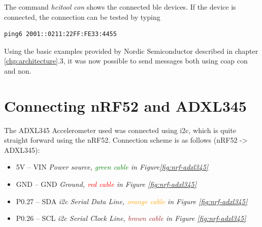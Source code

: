 The command \textit{hcitool con} shows the connected \gls{ble} devices. If the device is connected, the connection can be tested by typing

\begin{verbatim}
ping6 2001::0211:22FF:FE33:4455
\end{verbatim}


Using the basic examples provided by Nordic Semiconductor described in chapter \ref{chp:architecture}.3, it was now possible to send messages both using \gls{coap} \gls{con} and \gls{non}.  


\section{Connecting nRF52 and ADXL345}

The ADXL345 Accelerometer used was connected using \gls{i2c}, which is quite straight forward using the nRF52. Connection scheme is as follows (nRF52 -> ADXL345): 

\begin{itemize}
  \item 5V -- VIN		\tab  	\textit{Power source, \textcolor{green}{green cable} in Figure\ref{fig:nrf-adxl345}}
  \item GND -- GND 		\tab 	\textit{Ground, \textcolor{red}{red cable} in Figure \ref{fig:nrf-adxl345}}
  \item P0.27 -- SDA	\tab	\textit{\gls{i2c} Serial Data Line, \textcolor{orange}{orange cable} in Figure \ref{fig:nrf-adxl345}}
  \item P0.26 -- SCL	\tab 	\textit{\gls{i2c} Serial Clock Line, \textcolor{brown}{brown cable} in Figure \ref{fig:nrf-adxl345}}
\end{itemize} 

